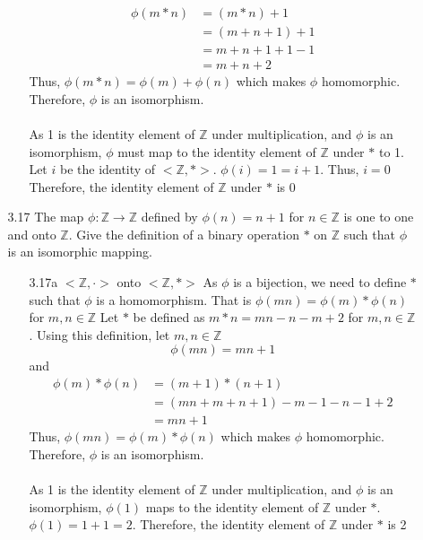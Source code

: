 \documentclass[12pt]{article}
\newcommand{\Z}{\mathds{Z}}
\begin{document}
\begin{enumerate}
\begin{enumerate}
\begin{enumerate}
\begin{align*}
						\phi(m * n) &= (m*n)+1\\
						&= (m+n+1)+1\\
						&= m + n + 1 + 1 -1\\
						&= m+n+2
					\end{align*}
					Thus, $ \phi(m*n)=\phi(m)+\phi(n) $ which makes $ \phi $ homomorphic.\\
					Therefore, $ \phi $ is an isomorphism.\\
					\\
					As 1 is the identity element of $\Z$  under multiplication, and $ \phi $ is an isomorphism, $ \phi $ must map to the identity element of $ \Z $ under $ * $ to 1. Let $i$ be the identity of $<\Z,*>$. $ \phi(i) = 1 = i +1 $. Thus, $i=0$ Therefore, the identity element of $ \Z $ under $ * $ is 0
			\end{enumerate}
			
			\item[3.17] The map $\phi: \Z \rightarrow \Z$ defined by $\phi(n)=n+1$ for $n \in \Z$ is one to one and onto $\Z$. Give the definition of a binary operation $*$ on $\Z$ such that $\phi$ is an isomorphic mapping.
			\begin{enumerate}
				\item[3.17a] $<\Z,\cdot>$ onto $<\Z,*>$
				As $ \phi $ is a bijection, we need to define $ * $ such that $ \phi $ is a homomorphism. That is $ \phi(mn)=\phi(m)*\phi(n) $ for $ m,n \in\Z $
				Let $ * $ be defined as $ m*n = mn-n-m+2$ for $ m,n\in\Z $. Using this definition, let $ m,n\in\Z $
				\[\phi(mn)=mn+1\] and
				\begin{align*}
					\phi(m)*\phi(n) &= (m+1)*(n+1)\\
					&= (mn+m+n+1)-m-1-n-1+2\\
					&= mn+1
				\end{align*}
				Thus, $ \phi(mn)=\phi(m)*\phi(n) $ which makes $ \phi $ homomorphic.\\
				Therefore, $ \phi $ is an isomorphism.\\
				\\
				As 1 is the identity element of $\Z$  under multiplication, and $ \phi $ is an isomorphism, $ \phi(1) $ maps to the identity element of $ \Z $ under $ * $. $ \phi(1) = 1+1=2 $. Therefore, the identity element of $ \Z $ under $ * $ is 2
				

\end{enumerate}
\end{enumerate}
\end{enumerate}
\end{document}
